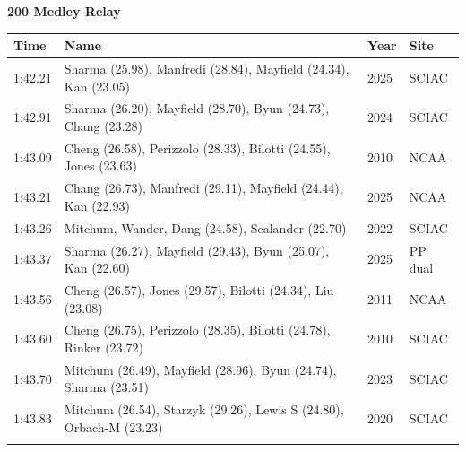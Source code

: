 \noindent\begin{minipage}[t]{0.98\textwidth}
\centering
\textbf{\textcolor{teamprimary}{200 Medley Relay}}\par
\vspace{0.5em}
\centering
\small
\renewcommand{\arraystretch}{1.0}
\setlength{\tabcolsep}{4pt}
\begin{tabular}{@{}p{2.7cm}p{4.3cm}p{1.6cm}p{2.7cm}@{}}
\toprule
\textbf{Time} & \textbf{Name} & \textbf{Year} & \textbf{Site} \\
\midrule
1:42.21 & Sharma (25.98), Manfredi (28.84), Mayfield (24.34), Kan (23.05) & 2025 & SCIAC \\
1:42.91 & Sharma (26.20), Mayfield (28.70), Byun (24.73), Chang (23.28) & 2024 & SCIAC \\
1:43.09 & Cheng (26.58), Perizzolo (28.33), Bilotti (24.55), Jones (23.63) & 2010 & NCAA \\
1:43.21 & Chang (26.73), Manfredi (29.11), Mayfield (24.44), Kan (22.93) & 2025 & NCAA \\
1:43.26 & Mitchum, Wander, Dang (24.58), Sealander (22.70) & 2022 & SCIAC \\
1:43.37 & Sharma (26.27), Mayfield (29.43), Byun (25.07), Kan (22.60) & 2025 & PP dual \\
1:43.56 & Cheng (26.57), Jones (29.57), Bilotti (24.34), Liu (23.08) & 2011 & NCAA \\
1:43.60 & Cheng (26.75), Perizzolo (28.35), Bilotti (24.78), Rinker (23.72) & 2010 & SCIAC \\
1:43.70 & Mitchum (26.49), Mayfield (28.96), Byun (24.74), Sharma (23.51) & 2023 & SCIAC \\
1:43.83 & Mitchum (26.54), Starzyk (29.26), Lewis S (24.80), Orbach-M (23.23) & 2020 & SCIAC \\
\bottomrule
\vspace{0.5em}
\end{tabular}
\end{minipage}
\vspace{1.2em}
